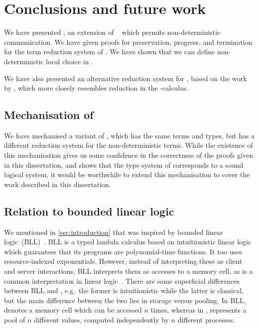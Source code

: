 \chapter{Conclusions and future work}\label{sec:discussion}
We have presented \nodcap, an extension of \cp~\cite{wadler2012} which permits
non-deterministic communication. 
We have given proofs for preservation, progress, and termination for the term
reduction system of \nodcap.
We have shown that we can define non-deterministic local choice in \nodcap.

We have also presented an alternative reduction system for \cp, based on the
work by , which more closely resembles reduction
in the \textpi-calculus.

\section{Mechanisation of \nodcap}
We have mechanised a variant of \nodcap, which has the same terms and types, but
has a different reduction system for the non-deterministic terms.
While the existence of this mechanisation gives us some confidence in the
correctness of the proofs given in this dissertation, and shows that the type
system of \nodcap corresponds to a sound logical system, it would be worthwhile
to extend this mechanisation to cover the work described in this dissertation.

\section{Relation to bounded linear logic}
We mentioned in \cref{sec:introduction} that \nodcap was inspired by
bounded linear logic~(BLL)~\cite{girard1992}. BLL is a typed lambda calculus
based on intuitionistic linear logic which guarantees that its programs are
polynomial-time functions.
It too uses resource-indexed exponentials. However, instead of interpreting
these as client and server interactions, BLL interprets them as accesses to a
memory cell, as is a common interpretation in linear logic~\cite{girard1987}.
There are some superficial differences between BLL and \nodcap, e.g.\ the former
is intuitionistic while the latter is classical, but the main difference between
the two lies in storage versus pooling. In BLL,  denotes a memory
cell which can be accessed $n$ times, whereas in \nodcap, 
represents a pool of $n$ different values, computed independently by $n$
different processes.

